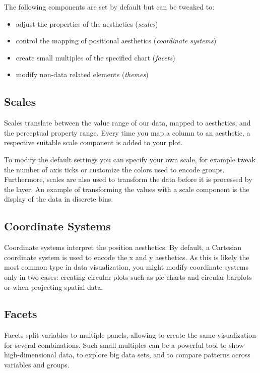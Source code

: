\documentclass[
]{krantz}
\providecommand{\tightlist}{%
  \setlength{\itemsep}{0pt}\setlength{\parskip}{0pt}}
\begin{document}
The following components are set by default but can be tweaked to:

\begin{itemize}
\tightlist
\item
  adjust the properties of the aesthetics (\emph{scales})
\item
  control the mapping of positional aesthetics (\emph{coordinate systems})
\item
  create small multiples of the specified chart (\emph{facets})
\item
  modify non-data related elements (\emph{themes})
\end{itemize}

\hypertarget{scales}{%
\subsection{Scales}\label{scales}}

Scales translate between the value range of our data, mapped to aesthetics, and the perceptual property range. Every time you map a column to an aesthetic, a respective suitable scale component is added to your plot.

To modify the default settings you can specify your own scale, for example tweak the number of axis ticks or customize the colors used to encode groups. Furthermore, scales are also used to transform the data before it is processed by the layer. An example of transforming the values with a scale component is the display of the data in discrete bins.

\hypertarget{coords}{%
\subsection{Coordinate Systems}\label{coords}}

Coordinate systems interpret the position aesthetics. By default, a Cartesian coordinate system is used to encode the x and y aesthetics. As this is likely the most common type in data visualization, you might modify coordinate systems only in two cases: creating circular plots such as pie charts and circular barplots or when projecting spatial data.

\hypertarget{facets}{%
\subsection{Facets}\label{facets}}

Facets split variables to multiple panels, allowing to create the same visualization for several combinations. Such small multiples can be a powerful tool to show high-dimensional data, to explore big data sets, and to compare patterns across variables and groups.
\end{document}
